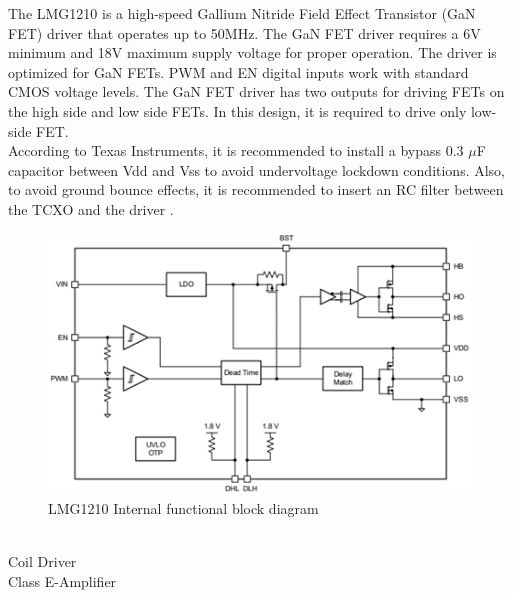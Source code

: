 \documentclass[12pt]{article}
\begin{document}
\indent
The LMG1210 is a high-speed Gallium Nitride Field Effect Transistor (GaN FET) driver that operates up to 50MHz. The GaN FET driver requires a 6V minimum and 18V maximum supply voltage for proper operation. The driver is optimized for GaN FETs. PWM and EN digital inputs work with standard CMOS voltage levels.
The GaN FET driver has two outputs for driving FETs on the high side and low side FETs. In this design, it is required to drive only low-side FET.\\

\indent
According to Texas Instruments, it is recommended to install a bypass 0.3 $\mu$F capacitor between Vdd and Vss to avoid undervoltage lockdown conditions. Also, to avoid ground bounce effects, it is recommended to insert an RC filter between the TCXO and the driver \cite{LMG1210}.\\
\hfill
\begin{figure}[h!]
\centering
\includegraphics[width=0.7\linewidth]{lmg1210_int}
\caption{LMG1210 Internal functional block diagram \cite{LMG1210}}
\end{figure}
\pagebreak
\hfill \\
Coil Driver\\
Class E-Amplifier\\
\end{document}
